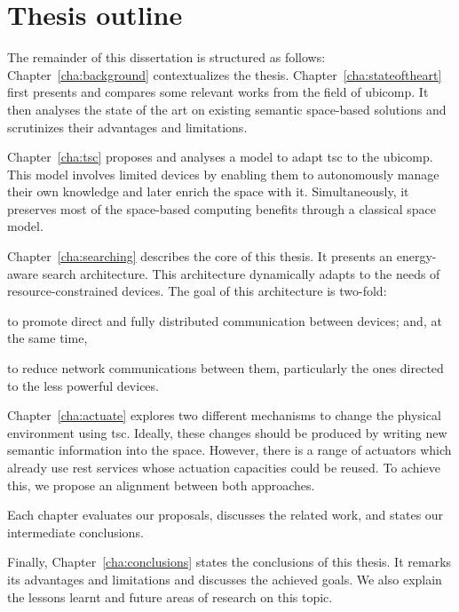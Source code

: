 \section{Thesis outline}
\label{sec:Outline}


The remainder of this dissertation is structured as follows:
Chapter~\ref{cha:background} contextualizes the thesis.
Chapter~\ref{cha:stateoftheart} first presents and compares some relevant works from the field of \acl{ubicomp}. %
It then analyses the state of the art on existing semantic space-based solutions and scrutinizes their advantages and limitations.

Chapter~\ref{cha:tsc} proposes and analyses a model to adapt \ac{tsc} to the \ac{ubicomp}.
This model involves limited devices by enabling them to autonomously manage their own knowledge and later enrich the space with it.
Simultaneously, it preserves most of the space-based computing benefits through a classical space model.

Chapter~\ref{cha:searching} describes the core of this thesis.
It presents an energy-aware search architecture.
This architecture dynamically adapts to the needs of resource-constrained devices.
The goal of this architecture is two-fold:
\begin{enumerate*}[label=\itshape\alph*\upshape)]
  \item to promote direct and fully distributed communication between devices;
and, at the same time,
  \item to reduce network communications between them, particularly the ones directed to the less powerful devices.
\end{enumerate*}

Chapter~\ref{cha:actuate} explores two different mechanisms to change the physical environment using \ac{tsc}.
Ideally, these changes should be produced by writing new semantic information into the space. %
However, there is a range of actuators which already use \ac{rest} services whose actuation capacities could be reused.
To achieve this, we propose an alignment between both approaches. %


Each chapter evaluates our proposals, discusses the related work, and states our intermediate conclusions. %

Finally, Chapter~\ref{cha:conclusions} states the conclusions of this thesis.
It remarks its advantages and limitations and discusses the achieved goals.
We also explain the lessons learnt and future areas of research on this topic. %